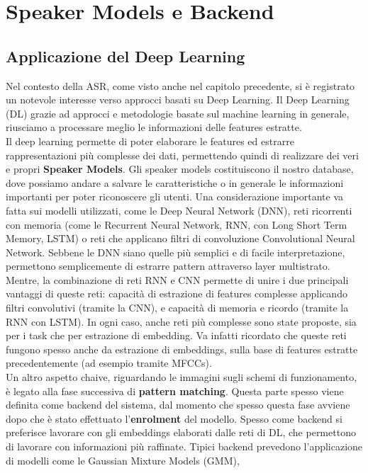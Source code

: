 \chapter{Speaker Models e Backend}
\label{ch:speakermodels}

\section{Applicazione del Deep Learning}
Nel contesto della ASR, come visto anche nel capitolo precedente, si è registrato un notevole interesse verso approcci basati su Deep Learning. 
Il Deep Learning (DL) grazie ad approcci e metodologie basate sul machine learning in generale, riusciamo a processare meglio le informazioni 
delle features estratte. \\
Il deep learning \cite{tirumala2016review} permette di poter elaborare le features ed estrarre rappresentazioni più complesse dei dati, permettendo quindi di realizzare dei
veri e propri \textbf{Speaker Models}. Gli speaker models costituiscono il nostro database, dove possiamo andare a salvare le caratteristiche o 
in generale le informazioni importanti per poter riconoscere gli utenti. 
Una considerazione importante va fatta sui modelli utilizzati, come le Deep Neural Network (DNN), reti ricorrenti con memoria (come le Recurrent Neural Network, RNN, con Long Short Term Memory, LSTM) 
o reti che applicano filtri di convoluzione Convolutional Neural Network.
Sebbene le DNN siano quelle più semplici e di facile interpretazione, permettono semplicemente di estrarre pattern attraverso layer multistrato. Mentre, la combinazione
di reti RNN e CNN permette di unire i due principali vantaggi di queste reti: capacità di estrazione di features complesse applicando filtri convolutivi (tramite la CNN),
e capacità di memoria e ricordo (tramite la RNN con LSTM). In ogni caso, anche reti più complesse sono state proposte, sia per i task che per estrazione di embedding. 
Va infatti ricordato che queste reti fungono spesso anche da estrazione di embeddings, sulla base di features estratte precedentemente (ad esempio tramite MFCCs). \\
Un altro aspetto chaive, riguardando le immagini sugli schemi di funzionamento, è legato alla fase successiva di \textbf{pattern matching}. Questa parte spesso viene definita come
backend del sistema, dal momento che spesso questa fase avviene dopo che è stato effettuato l'\textbf{enrolment} del modello. Spesso come backend si preferisce lavorare con gli embeddings 
elaborati dalle reti di DL, che permettono di lavorare con informazioni più raffinate. Tipici backend prevedono l'applicazione di modelli come le Gaussian Mixture Models (GMM),
